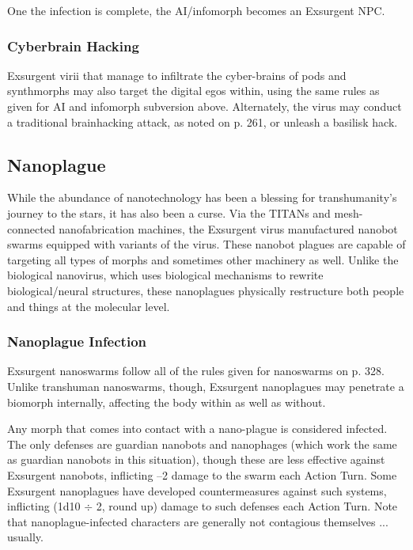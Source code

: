 One the infection is complete, the AI/infomorph becomes an Exsurgent NPC. 

\subsubsection{Cyberbrain Hacking} 

Exsurgent virii that manage to infiltrate the cyber-brains of pods and synthmorphs may also target the digital egos within, using the same rules as given for AI and infomorph subversion above. Alternately, the virus may conduct a traditional brainhacking attack, as noted on p. 261, or unleash a basilisk hack. 

\subsection{Nanoplague} 

While the abundance of nanotechnology has been a blessing for transhumanity's journey to the stars, it has also been a curse. Via the TITANs and mesh-connected nanofabrication machines, the Exsurgent virus manufactured nanobot swarms equipped with variants of the virus. These nanobot plagues are capable of targeting all types of morphs and sometimes other machinery as well. Unlike the biological nanovirus, which uses biological mechanisms to rewrite biological/neural structures, these nanoplagues physically restructure both people and things at the molecular level. 

\subsubsection{Nanoplague Infection} 

Exsurgent nanoswarms follow all of the rules given for nanoswarms on p. 328. Unlike transhuman nanoswarms, though, Exsurgent nanoplagues may penetrate a biomorph internally, affecting the body within as well as without. 

Any morph that comes into contact with a nano-plague is considered infected. The only defenses are guardian nanobots and nanophages (which work the same as guardian nanobots in this situation), though these are less effective against Exsurgent nanobots, inflicting –2 damage to the swarm each Action Turn. Some Exsurgent nanoplagues have developed countermeasures against such systems, inflicting (1d10 $\div$ 2, round up) damage to such defenses each Action Turn. Note that nanoplague-infected characters are generally not contagious themselves ... usually. 

